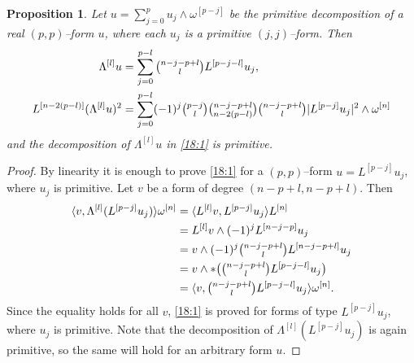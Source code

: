 \documentclass[11pt,a4paper]{amsart}
\def\wp#1{\omega^{[#1]}}
\def\lp#1{L^{[#1]}}
\def\Lp#1{\Lambda^{[#1]}}
\def\la{\langle}
\def\ra{\rangle}
\newtheorem{prop}[theo]{Proposition}
\theoremstyle{definition}
\numberwithin{equation}{section}
\begin{document}
\begin{prop}
    \label{prop:morphism}
Let $u = \sum_{j=0}^p u_j \wedge \wp{p-j}$ be the primitive
decomposition of a real $(p,p)$--form $u$, where each $u_j$ is a
primitive $(j,j)$--form. Then
\begin{align}
  \label{18:1}
  \Lp l u 
  &= \sum_{j=0}^{p-l} \tbinom{n-j-p+l}{l} \lp{p-j-l} u_j , \\
  \label{18:2}
  \lp{n-2(p-l)} (\Lp l u)^2   
  &= \sum_{j=0}^{p-l} 
  (-1)^j
  \tbinom{p-j}{l}
  \tbinom{n-j-p+l}{n-2(p-l)}
  \tbinom{n-j-p+l}{l}
  \lvert \lp{p-j} u_j \rvert^2
  \wedge \wp n
\end{align}
and the decomposition of $\Lp l u$ in \eqref{18:1} is primitive.
\end{prop}

\begin{proof}
  By linearity it is enough to prove \eqref{18:1} for a $(p,p)$--form
$u = \lp{p-j} u_j$, where $u_j$ is primitive. Let $v$ be a form
of degree $(n-p+l,n-p+l)$. Then
  \begin{align*}
    \la v, \Lp l (\lp{p-j} u_j ) \ra \wp n
    &= \la \lp l v, \lp{p-j} u_j \ra \lp n \\
    &= \lp l v \wedge (-1)^j \lp{n-j-p} u_j  \\
    &= v \wedge (-1)^j \tbinom{n-j-p+l}{l} \lp{n-j-p+l} u_j  \\
    &= v \wedge * \bigl( \tbinom{n-j-p+l}{l} \lp{p-j-l} u_j \bigr) \\
    &= \la v, \tbinom{n-j-p+l}{l} \lp{p-j-l} u_j \ra \wp n.
  \end{align*}
Since the equality holds for all $v$, \eqref{18:1} is proved for forms
of type $\lp{p-j} u_j$, where $u_j$ is primitive. Note that the
decomposition of $\Lp l (\lp{p-j} u_j)$ is again primitive, so
the same will hold for an arbitrary form $u$.


\end{proof}
\end{document}
